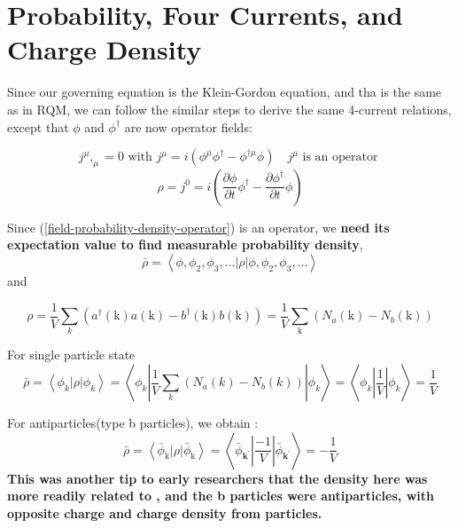 \section{Probability, Four Currents, and Charge Density}
Since our governing equation is the Klein-Gordon equation, and tha is the same as in RQM, we can follow the similar steps to derive the same 4-current relations, except that $\phi$ and $\phi^{\dagger}$ are now operator fields:
\begin{qt}
    \begin{equation}
j^{\mu},_{\mu}=0 \text { with } j^{\mu}=i\left(\phi^{\mu} \phi^{\dagger}-\phi^{\dagger \mu} \phi\right) \quad j^{\mu} \text { is an operator }
\label{field-4-current}
\end{equation}
\begin{equation}
\rho=j^{0}=i\left(\frac{\partial \phi}{\partial t} \phi^{\dagger}-\frac{\partial \phi^{\dagger}}{\partial t} \phi\right)
\label{field-probability-density-operator}
\end{equation}
\end{qt}
Since (\ref{field-probability-density-operator}) is an operator, we \textbf{need its expectation value to find measurable probability density},
$$
\bar{\rho}=\left\langle\phi, \phi_{2}, \phi_{3}, \ldots|\rho| \phi, \phi_{2}, \phi_{3}, \ldots\right\rangle
$$
and
\begin{qt}
    \begin{equation}
        \rho=\frac{1}{V} \sum_{k}\left(a^{\dagger}(\mathrm{k}) a(\mathrm{k})-b^{\dagger}(\mathrm{k}) b(\mathrm{k})\right)=\frac{1}{V} \sum_{\mathrm{k}}\left(N_{a}(\mathrm{k})-N_{b}(\mathrm{k})\right)
    \end{equation}
\end{qt}
For single particle state
$$
\bar{\rho}=\left\langle\phi_{k}|\rho| \phi_{k}\right\rangle=\left\langle\phi_{k}\left|\frac{1}{V} \sum_{k}\left(N_{a}(k)-N_{b}(k)\right)\right| \phi_{k}\right\rangle=\left\langle\phi_{k}\left|\frac{1}{V}\right| \phi_{k}\right\rangle=\frac{1}{V}
$$

For antiparticles(type b particles), we obtain :
$$
\bar{\rho}=\left\langle\bar{\phi}_{\mathrm{k}}|\rho| \bar{\phi}_{\mathrm{k}}\right\rangle=\left\langle\bar{\phi}_{\mathbf{k}^{\prime}}\left|\frac{-1}{V}\right| \bar{\phi}_{\mathbf{k}^{\prime}}\right\rangle=-\frac{1}{V}
$$
\textbf{This was another tip to early researchers that the density here was more readily related to , and the b particles were antiparticles, with opposite charge and charge density from particles.}
